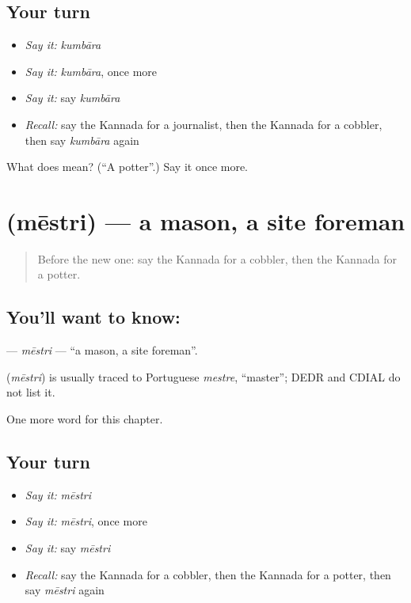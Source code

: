 \subsection*{Your turn}
\begin{itemize}
\raggedright
  \item \emph{Say it:} \emph{kumbāra}
  \item \emph{Say it:} \emph{kumbāra}, once more
  \item \emph{Say it:} say \emph{kumbāra}
  \item \emph{Recall:} say the Kannada for a journalist, then the Kannada for a cobbler, then say \emph{kumbāra} again
\end{itemize}

\begin{tcolorbox}[breakable,colback=teal!4,colframe=teal!35!black,title={Before you move on}]
What does  mean? (\textquotedblleft{}A potter\textquotedblright{}.) Say it once more.
\end{tcolorbox}
\section[\texorpdfstring{\kn{ಮೇಸ್ತ್ರಿ} (mēstri)}{ಮೇಸ್ತ್ರಿ (mēstri)}]{ (mēstri) — a mason, a site foreman}

\label{lesson:KA-C306-mestri}



\begin{quote}
Before the new one: say the Kannada for a cobbler, then the Kannada for a potter.
\end{quote}

\subsection*{You'll want to know: }
\textbf{} — \emph{mēstri} — \textquotedblleft{}a mason, a site foreman\textquotedblright{}.

\begin{cousinweb}
\textbf{} (\emph{mēstri}) is usually traced to Portuguese \emph{mestre}, \textquotedblleft{}master\textquotedblright{}; DEDR and CDIAL do not list it.
\end{cousinweb}

\begin{grammarlens}[title={What you've built}]
One more word for this chapter.
\end{grammarlens}

\subsection*{Your turn}
\begin{itemize}
\raggedright
  \item \emph{Say it:} \emph{mēstri}
  \item \emph{Say it:} \emph{mēstri}, once more
  \item \emph{Say it:} say \emph{mēstri}
  \item \emph{Recall:} say the Kannada for a cobbler, then the Kannada for a potter, then say \emph{mēstri} again
\end{itemize}

